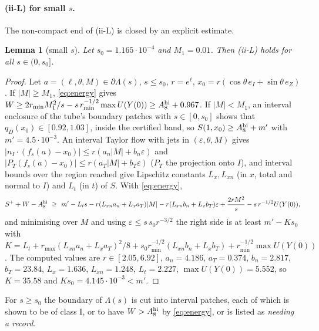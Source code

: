 \documentclass[11pt]{article}
\newtheorem{lemma}[theorem]{Lemma}
\theoremstyle{definition}
\begin{document}
\paragraph{(ii-L) for small $s$.} The non-compact end of (ii-L) is closed by an explicit estimate.
\begin{lemma}[small $s$]\label{lem:smalls}
Let $s_0=1.165\cdot10^{-4}$ and $M_1=0.01$. Then (ii-L) holds for all $s\in(0,s_0]$.
\end{lemma}
\begin{proof}
Let $a=(\ell,\theta,M)\in\partial\Lambda(s)$, $s\le s_0$, $r=e^\ell$, $x_0=r(\cos\theta\,e_I+\sin\theta\,e_Z)$. If
$|M|\ge M_1$, \eqref{eq:energy} gives $W\ge2r_{\min}M_1^2/s-s\,r_{\min}^{-1/2}\max U(Y(0))\ge A_8^{\rm hi}+0.967$. If
$|M|<M_1$, an interval enclosure of the tube's boundary patches with $s\in[0,s_0]$ shows that $q_D(x_0)\in[0.92,1.03]$,
inside the certified band, so $S(1,x_0)\ge A_8^{\rm hi}+m'$ with $m'=4.5\cdot10^{-3}$. An interval Taylor flow with jets
in $(\varepsilon,\theta,M)$ gives $|n_I\cdot(f_s(a)-x_0)|\le r(a_n|M|+b_n\varepsilon)$ and
$|P_T(f_s(a)-x_0)|\le r(a_T|M|+b_T\varepsilon)$ ($P_T$ the projection onto $I$), and interval bounds over the region
reached give Lipschitz constants $L_x,L_{xn}$ (in $x$, total and normal to $I$) and $L_t$ (in $t$) of $S$. With
\eqref{eq:energy},
\[
S^++W-A_8^{\rm hi}\ \ge\ m'-L_ts-r(L_{xn}a_n+L_xa_T)|M|-r(L_{xn}b_n+L_xb_T)\varepsilon+\frac{2rM^2}{s}-s\,r^{-1/2}U(Y(0)),
\]
and minimising over $M$ and using $\varepsilon\le s\,s_0r^{-3/2}$ the right side is at least $m'-Ks_0$ with
$K=L_t+r_{\max}(L_{xn}a_n+L_xa_T)^2/8+s_0r_{\min}^{-1/2}(L_{xn}b_n+L_xb_T)+r_{\min}^{-1/2}\max U(Y(0))$. The computed
values are $r\in[2.05,6.92]$, $a_n=4.186$, $a_T=0.374$, $b_n=2.817$, $b_T=23.84$, $L_x=1.636$, $L_{xn}=1.248$,
$L_t=2.227$, $\max U(Y(0))=5.552$, so $K=35.58$ and $Ks_0=4.145\cdot10^{-3}<m'$.
\end{proof}
For $s\ge s_0$ the boundary of $\Lambda(s)$ is cut into interval patches, each of which is shown to be of class I, or to
have $W>A_8^{\rm hi}$ by \eqref{eq:energy}, or is listed as \emph{needing a record}.
\end{document}
